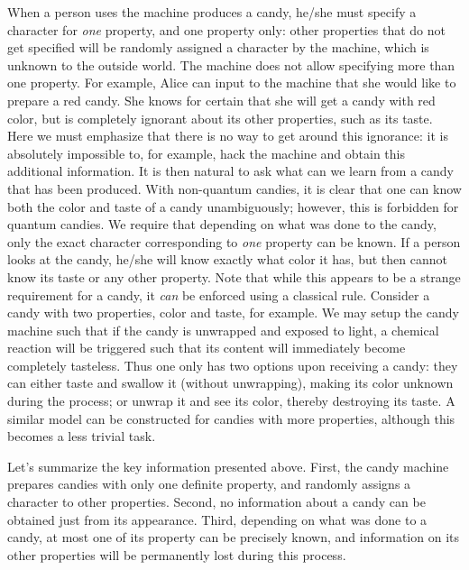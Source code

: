 \documentclass{article}
\begin{document}
When a person uses the machine produces a candy, he/she must specify a character for \textit{one} property, and one property only: other properties that do not get specified will be randomly assigned a character by the machine, which is unknown to the outside world.
The machine does not allow specifying more than one property.
For example, Alice can input to the machine that she would like to prepare a red candy.
She knows for certain that she will get a candy with red color, but is completely ignorant about its other properties, such as its taste.
Here we must emphasize that there is no way to get around this ignorance: it is absolutely impossible to, for example, hack the machine and obtain this additional information.
It is then natural to ask what can we learn from a candy that has been produced.
With non-quantum candies, it is clear that one can know both the color and taste of a candy unambiguously; however, this is forbidden for quantum candies.
We require that depending on what was done to the candy, only the exact character corresponding to \textit{one} property can be known.
If a person looks at the candy, he/she will know exactly what color it has, but then cannot know its taste or any other property.
Note that while this appears to be a strange requirement for a candy, it \textit{can} be enforced using a classical rule.
Consider a candy with two properties, color and taste, for example.
We may setup the candy machine such that if the candy is unwrapped and exposed to light, a chemical reaction will be triggered such that its content will immediately become completely tasteless.
Thus one only has two options upon receiving a candy: they can either taste and swallow it (without unwrapping), making its color unknown during the process; or unwrap it and see its color, thereby destroying its taste.
A similar model can be constructed for candies with more properties, although this becomes a less trivial task.

Let's summarize the key information presented above.
First, the candy machine prepares candies with only one definite property, and randomly assigns a character to other properties.
Second, no information about a candy can be obtained just from its appearance.
Third, depending on what was done to a candy, at most one of its property can be precisely known, and information on its other properties will be permanently lost during this process.
\end{document}
